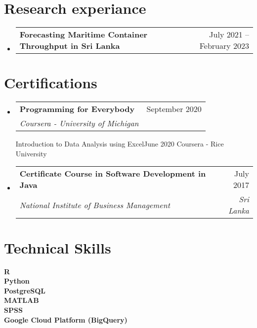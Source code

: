 \documentclass[letterpaper,11pt]{article}
\makeatletter
\newcommand{\resumeSubheading}[4]{
  \vspace{-2pt}\item
    \begin{tabular*}{0.97\textwidth}[t]{l@{\extracolsep{\fill}}r}
      \textbf{#1} & #2 \\
      \textit{\small#3} & \textit{\small #4} \\
    \end{tabular*}\vspace{-7pt}
}
\newcommand{\resumeProjectHeading}[2]{
    \item
    \begin{tabular*}{0.97\textwidth}{l@{\extracolsep{\fill}}r}
      \small#1 & #2 \\
    \end{tabular*}\vspace{-7pt}
}
\newcommand{\resumeSubHeadingListStart}{\begin{itemize}[leftmargin=0.15in, label={}]}
\newcommand{\resumeSubHeadingListEnd}{\end{itemize}}
\makeatother
\begin{document}
\section{Research experiance}

    \resumeSubHeadingListStart
      \resumeProjectHeading
          {\textbf{Forecasting Maritime Container Throughput in Sri Lanka} }{July 2021 -- February 2023}
    \resumeSubHeadingListEnd


%
\section{Certifications}
  \resumeSubHeadingListStart
  
    \resumeSubheading
      {Programming for Everybody}{September 2020}
      {Coursera - University of Michigan}
      
    \resumeSubheading
      {Introduction to Data Analysis using Excel}{June 2020}
      {Coursera - Rice University}
      
      
    \resumeSubheading
      {Certificate Course in Software Development in Java}{July 2017}
      { National Institute of Business Management}{Sri Lanka}
    \resumeSubHeadingListEnd

\section{Technical Skills}
 \begin{itemize}[leftmargin=0.15in, label={}]
    \small{\item{
     \textbf{R} \\
     \textbf{Python} \\
     \textbf{PostgreSQL} \\
     \textbf{MATLAB} \\
     \textbf{SPSS} \\
     \textbf{Google Cloud Platform (BigQuery)}
    }}
 \end{itemize}


\end{document}
